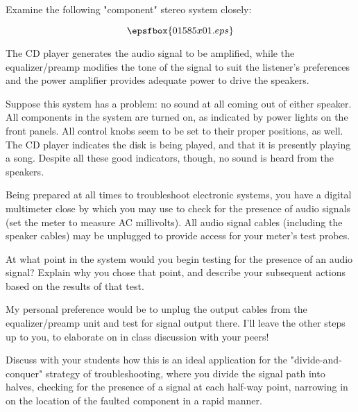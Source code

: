 

Examine the following "component" stereo system closely:

$$\epsfbox{01585x01.eps}$$

The CD player generates the audio signal to be amplified, while the equalizer/preamp modifies the tone of the signal to suit the listener's preferences and the power amplifier provides adequate power to drive the speakers.

Suppose this system has a problem: no sound at all coming out of either speaker.  All components in the system are turned on, as indicated by power lights on the front panels.  All control knobs seem to be set to their proper positions, as well.  The CD player indicates the disk is being played, and that it is presently playing a song.  Despite all these good indicators, though, no sound is heard from the speakers.

Being prepared at all times to troubleshoot electronic systems, you have a digital multimeter close by which you may use to check for the presence of audio signals (set the meter to measure AC millivolts).  All audio signal cables (including the speaker cables) may be unplugged to provide access for your meter's test probes.

At what point in the system would you begin testing for the presence of an audio signal?  Explain why you chose that point, and describe your subsequent actions based on the results of that test.







My personal preference would be to unplug the output cables from the equalizer/preamp unit and test for signal output there.  I'll leave the other steps up to you, to elaborate on in class discussion with your peers!







Discuss with your students how this is an ideal application for the "divide-and-conquer" strategy of troubleshooting, where you divide the signal path into halves, checking for the presence of a signal at each half-way point, narrowing in on the location of the faulted component in a rapid manner.





